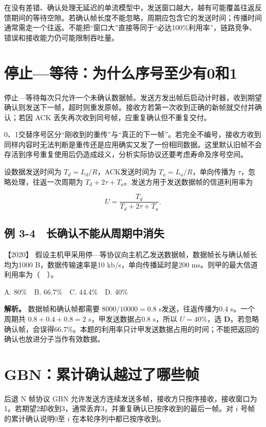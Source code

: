 在没有差错、确认处理无延迟的单流模型中，发送窗口越大，越有可能覆盖往返反馈期间的等待空隙。若确认帧长度不能忽略，周期应包含它的发送时间；传播时间通常需走一个往返。不能把``窗口大''直接等同于``必达100\%利用率''，链路竞争、错误和接收能力仍可能限制吞吐量。

\section{停止---等待：为什么序号至少有0和1}\label{cn-03-06}

停止---等待每次只允许一个未确认数据帧。发送方发出帧后启动计时器，收到期望确认则发送下一帧，超时则重发原帧。接收方若第一次收到正确的新帧就交付并确认；若因 ACK 丢失再次收到同号帧，应重复确认但不重复交付。

0、1交替序号区分``刚收到的重传''与``真正的下一帧''。若完全不编号，接收方收到同样内容时无法判断是重传还是应用确实又发了一份相同数据。这里默认旧帧不会存活到序号重复使用后仍造成歧义，分析实际协议还要考虑寿命及序号空间。

设数据发送时间为 \(T_d=L_d/R\)，ACK发送时间为 \(T_a=L_a/R\)，单向传播为 \(\tau\)，忽略处理，往返一次周期为 \(T_d+2\tau+T_a\)。发送方用于发送数据帧的信道利用率为

\[U=\frac{T_d}{T_d+2\tau+T_a}.\]

\subsection{例 3-4　长确认不能从周期中消失}\label{cn-ex3-4}

\noindent{}【2020】 假设主机甲采用停---等协议向主机乙发送数据帧，数据帧长与确认帧长均为1000 B，数据传输速率是10 kb/s，单向传播延时是200 ms。则甲的最大信道利用率为（　）。

A. 80\%　B. 66.7\%　C. 44.4\%　D. 40\%


\textbf{解析。} 数据帧和确认帧都需要 \(8000/10000=0.8\) s发送，往返传播为0.4 s。一个周期共 \(0.8+0.4+0.8=2\) s，甲发送数据占0.8 s，所以 \(U=40\%\)，选 \textbf{D}。若忽略确认帧，会误得66.7\%。本题的利用率只计甲发送数据占用的时间；不能把返回的确认也放进分子当作有效数据。

\section{GBN：累计确认越过了哪些帧}\label{cn-03-07}

后退 N 帧协议 GBN 允许发送方连续发送多帧，接收方只按序接收，接收窗口为1。若期望2却收到3，通常丢弃3，并重复确认已按序收到的最后一帧。对 \(i\) 号帧的累计确认说明0至 \(i\) 在本轮序列中都已按序收到。

